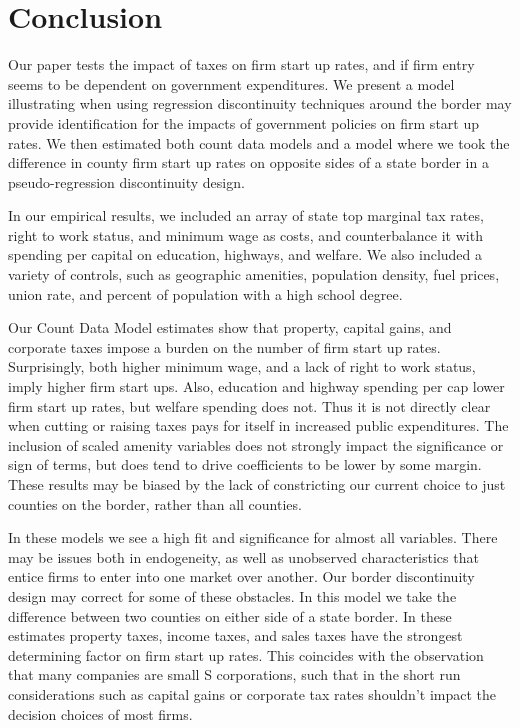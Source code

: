 \section{Conclusion}

Our paper tests the impact of taxes on firm start up rates, and if firm entry seems to be dependent on government expenditures. We present a model illustrating when using regression discontinuity techniques around the border may provide identification for the impacts of government policies on firm start up rates. We then estimated both count data models and a model where we took the difference in county firm start up rates on opposite sides of a state border in a pseudo-regression discontinuity design. 

In our empirical results, we included an array of state top marginal tax rates, right to work status, and minimum wage as costs, and counterbalance it with spending per capital on education, highways, and welfare. We also included a variety of controls, such as geographic amenities, population density, fuel prices, union rate, and percent of population with a high school degree.

Our Count Data Model estimates show that property, capital gains, and corporate taxes impose a burden on the number of firm start up rates. Surprisingly, both higher minimum wage, and a lack of right to work status, imply higher firm start ups. Also, education and highway spending per cap lower firm start up rates, but welfare spending does not. Thus it is not directly clear when cutting or raising taxes pays for itself in increased public expenditures. The inclusion of scaled amenity variables does not strongly impact the significance or sign of terms, but does tend to drive coefficients to be lower by some margin. These results may be biased by the lack of constricting our current choice to just counties on the border, rather than all counties.

In these models we see a high fit and significance for almost all variables. There may be issues both in endogeneity, as well as unobserved characteristics that entice firms to enter into one market over another. Our border discontinuity design may correct for some of these obstacles. In this model we take the difference between two counties on either side of a state border. In these estimates property taxes, income taxes, and sales taxes have the strongest determining factor on firm start up rates. This coincides with the observation that many companies are small S corporations, such that in the short run considerations such as capital gains or corporate tax rates shouldn't impact the decision choices of most firms.

